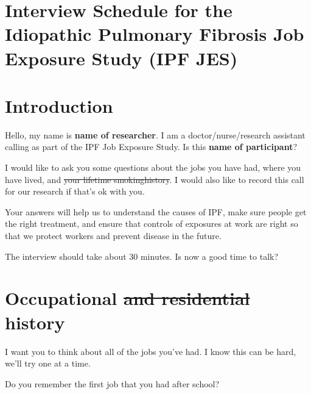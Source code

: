 \documentclass[a4paper,10pt]{article}
\providecommand{\DIFaddtex}[1]{{\protect\color{blue}\uwave{#1}}} %
\providecommand{\DIFdeltex}[1]{{\protect\color{red}\sout{#1}}}                      %
\providecommand{\DIFaddbegin}{} %
\providecommand{\DIFaddend}{} %
\providecommand{\DIFdelbegin}{} %
\providecommand{\DIFdelend}{} %
\providecommand{\DIFadd}[1]{\texorpdfstring{\DIFaddtex{#1}}{#1}} %
\providecommand{\DIFdel}[1]{\texorpdfstring{\DIFdeltex{#1}}{}} %
\begin{document}


\pagestyle{fancy}




\section*{Interview Schedule for the Idiopathic Pulmonary Fibrosis Job Exposure Study (IPF JES)}


\section{Introduction}

Hello, my name is \textbf{name of researcher}. I am a doctor/nurse/research assistant calling as part of the IPF Job Exposure Study. Is this \textbf{name of participant}? 

I would like to ask you some questions about the jobs you have had, where you have lived, and \DIFdelbegin \DIFdel{your lifetime smokinghistory}\DIFdelend \DIFaddbegin \DIFadd{smoking}\DIFaddend . I would also like to record this call for our research if that's ok with you.  

Your answers will help us to understand the causes of IPF, make sure people get the right treatment, and ensure that controls of exposures at work are right so that we protect workers and prevent disease in the future.  

The interview should take about 30 minutes. Is now a good time to talk?

\section{Occupational \DIFdelbegin \DIFdel{and residential }\DIFdelend history} 

I want you to think about all of the jobs you've had. I know this can be hard, we'll try one at a time. 

Do you remember the first job that you had after school?
\end{document}
